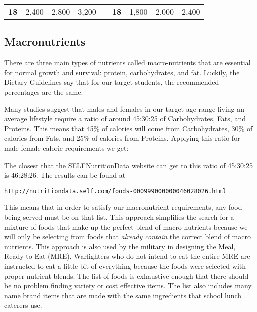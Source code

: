 \documentclass[letterpaper,oneside,12pt]{report}
\begin{document}
\begin{table}
\begin{tabular}{@{}|l|llll|l|lll@{}}
\textbf{18}    & \multicolumn{1}{l|}{2,400}              & \multicolumn{1}{l|}{2,800}             & \multicolumn{1}{l|}{3,200}           &  & \textbf{18}      & \multicolumn{1}{l|}{1,800}              & \multicolumn{1}{l|}{2,000}             & \multicolumn{1}{l|}{2,400}           \\ \cmidrule(r){1-4} \cmidrule(l){6-9} 
\end{tabular}
\end{table}

\subsection{Macronutrients}\label{Macronutrients}
There are three main types of nutrients called macro-nutrients that are essential for normal growth and survival: protein, carbohydrates, and fat.  Luckily, the Dietary Guidelines say that for our target students, the recommended percentages are the same. 



Many studies suggest that males and females in our target age range living an average lifestyle require a ratio of around 45:30:25 of Carbohydrates, Fats, and Proteins. This means that 45\% of calories will come from Carbohydrates, 30\% of calories from Fats, and 25\% of calories from Proteins. Applying this ratio for male female calorie requirements we get: 

The closest that the SELFNutritionData website can get to this ratio of 45:30:25 is 46:28:26. The results can be found at 

\texttt{http://nutritiondata.self.com/foods-000999000000046028026.html}

This means that in order to satisfy our macronutrient requirements, any food being served must be on that list. This approach simplifies the search for a mixture of foods that make up the perfect blend of macro nutrients because we will only be selecting from foods that \textit{already contain} the correct blend of macro nutrients. This approach is also used by the military in designing the Meal, Ready to Eat (MRE). Warfighters who do not intend to eat the entire MRE are instructed to eat a little bit of everything because the foods were selected with proper nutrient blends. The list of foods is exhaustive enough that there should be no problem finding variety or cost effective items. The list also includes many name brand items that are made with the same ingredients that school lunch caterers use. 
\end{document}

